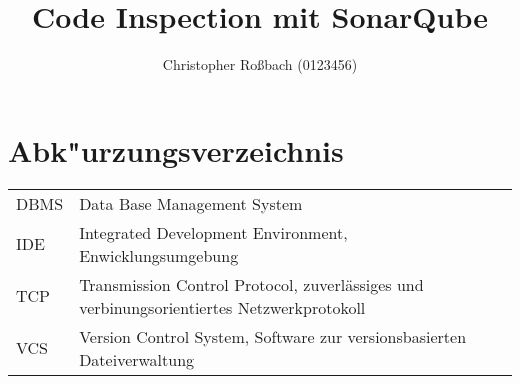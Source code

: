 \title{Code Inspection mit SonarQube}
\author{%
  Christopher Ro\ss bach (0123456)%
}

\newpage
{
\tableofcontents
\clearpage
\listoffigures
\section*{Abk"urzungsverzeichnis} %
\begin{tabularx}{\textwidth}{l X}
  DBMS & Data Base Management System\\
  IDE & Integrated Development Environment, Enwicklungsumgebung\\
  TCP & Transmission Control Protocol, zuverlässiges und verbinungsorientiertes Netzwerkprotokoll\autocite{wiki.tcp}\\
  VCS & Version Control System, Software zur versionsbasierten Dateiverwaltung
\end{tabularx}
\lstlistoflistings
}
